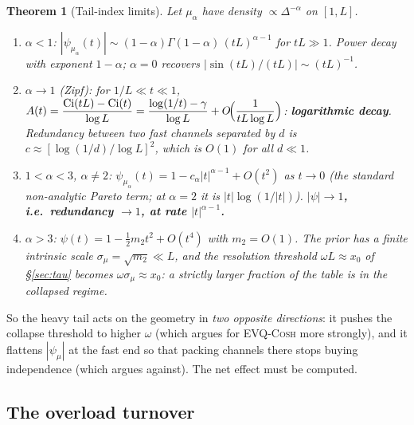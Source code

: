\documentclass[11pt]{article}
\newtheorem{theorem}{Theorem}[section]
\theoremstyle{definition}
\newcommand{\evq}{\textsc{EVQ-Cosh}}
\begin{document}
\begin{theorem}[Tail-index limits]\label{thm:tails}
Let $\mu_\alpha$ have density $\propto\Delta^{-\alpha}$ on $[1,L]$.
\begin{enumerate}
\item[\textup{(i)}] $\alpha<1$: $|\psi_{\mu_\alpha}(t)|\sim(1-\alpha)\Gamma(1-\alpha)\,(tL)^{\alpha-1}$
for $tL\gg1$. Power decay with exponent $1-\alpha$; $\alpha=0$ recovers $|\sin(tL)/(tL)|\sim(tL)^{-1}$.
\item[\textup{(ii)}] $\alpha\to1$ (Zipf): for $1/L\ll t\ll1$,
$\displaystyle A(t)=\frac{\mathrm{Ci}(tL)-\mathrm{Ci}(t)}{\log L}
=\frac{\log(1/t)-\gamma}{\log L}+O\!\Bigl(\frac{1}{t L\log L}\Bigr)$:
\textbf{logarithmic decay}. Redundancy between two fast channels separated by $d$ is
$c\approx[\log(1/d)/\log L]^2$, which is $O(1)$ for all $d\ll1$.
\item[\textup{(iii)}] $1<\alpha<3$, $\alpha\ne2$: $\psi_{\mu_\alpha}(t)=1-c_\alpha|t|^{\alpha-1}+O(t^2)$
as $t\to0$ (the standard non-analytic Pareto term; at $\alpha=2$ it is $|t|\log(1/|t|)$).
\textbf{$|\psi|\to1$, i.e.\ redundancy $\to1$, at rate $|t|^{\alpha-1}$.}
\item[\textup{(iv)}] $\alpha>3$: $\psi(t)=1-\tfrac12 m_2t^2+O(t^4)$ with $m_2=O(1)$. The prior has a
finite intrinsic scale $\sigma_\mu=\sqrt{m_2}\ll L$, and the resolution threshold $\omega L\approx x_0$
of \S\ref{sec:tau} becomes $\omega\sigma_\mu\approx x_0$: a strictly larger fraction of the table is
in the collapsed regime.
\end{enumerate}
\end{theorem}

So the heavy tail acts on the geometry in \emph{two opposite directions}: it pushes the collapse
threshold to higher $\omega$ (which argues for \evq{} more strongly), and it flattens $|\psi_\mu|$
at the fast end so that packing channels there stops buying independence (which argues against).
The net effect must be computed.

\subsection{The overload turnover}
\end{document}
